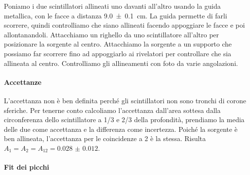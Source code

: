Poniamo i due scintillatori allineati uno davanti all'altro usando la guida metallica,
con le facce a distanza \SI{9.0 \pm 0.1}{cm}.
La guida permette di farli scorrere, quindi controlliamo che siano allineati
facendo appoggiare le facce e poi allontanandoli.
Attacchiamo un righello da uno scintillatore all'altro per posizionare la sorgente al centro.
Attacchiamo la sorgente a un supporto che possiamo far scorrere fino ad appoggiarlo ai rivelatori
per controllare che sia allineata al centro.
Controlliamo gli allineamenti con foto da varie angolazioni.

\paragraph{Accettanze}

L'accettanza non è ben definita perché gli scintillatori non sono tronchi di corone sferiche.
Per tenerne conto calcoliamo l'accettanza dall'area sottesa dalla circonferenza dello scintillatore
a 1/3 e 2/3 della profondità, prendiamo la media delle due come accettanza e la differenza come incertezza.
Poiché la sorgente è ben allineata, l'accettanza per le coincidenze a 2 è la stessa.
Risulta $A_1 = A_2 = A_{12} = \num{0.028(12)}$.

\paragraph{Fit dei picchi}

